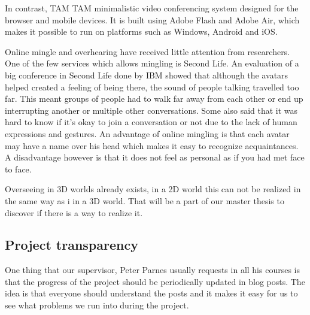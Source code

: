 \documentclass[12pt, titlepage]{article}
\begin{document}
In contrast, TAM TAM\cite{24} minimalistic video conferencing system designed for the browser and mobile devices. It is built using Adobe Flash and Adobe Air, which makes it possible to run on platforms such as Windows, Android and iOS.

Online mingle and overhearing have received little attention from researchers. One of the few services which allows mingling is Second Life\cite{3}. An evaluation of a big conference in Second Life done by IBM\cite{1} showed that although the avatars helped created a feeling of being there\cite{11}, the sound of people talking travelled too far. This meant groups of people had to walk far away from each other or end up interrupting another or multiple other conversations. Some also said that it was hard to know if it's okay to join a conversation or not due to the lack of human expressions and gestures. An advantage of online mingling is that each avatar may have a name over his head which makes it easy to recognize acquaintances. A disadvantage however is that it does not feel as personal as if you had met face to face\cite{1}.

Overseeing in 3D worlds already exists\cite{2}\cite{3}\cite{4}\cite{5}, in a 2D world this can not be realized in the same way as i in a 3D world. That will be a part of our master thesis to discover if there is a way to realize it.
\subsection{Project transparency}
One thing that our supervisor, Peter Parnes usually requests in all his courses is that the progress of the project should be periodically updated in blog posts. The idea is that everyone should understand the posts and it makes it easy for us to see what problems we run into during the project.
\end{document}
